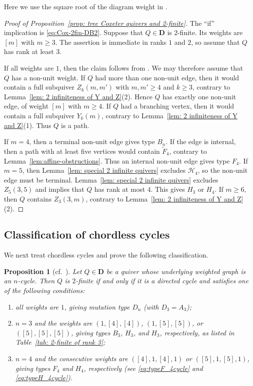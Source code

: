 \documentclass[11pt,reqno]{amsart}
\numberwithin{equation}{section}
\theoremstyle{definition}
\theoremstyle{plain}
\newtheorem{proposition}[example]{Proposition}
\newcommand{\D}{\mathbf{D}}
\newcommand{\bra}[1]{\left[#1\right]}
\begin{document}
	Here we use the square root of the diagram weight in \cite{FZ03a}.
	
	\begin{proof}[Proof of Proposition~\ref{prop: tree Coxeter quivers and 2-finite}]
		The ``if'' implication is \eqref{eq:Cox-2fin-DB2}. Suppose that $Q \in \D$ is $2$-finite. Its weights are $\bra m$ with $m\geq3$. The assertion is immediate in ranks $1$ and $2$, so assume that $Q$ has rank at least $3$.
		
		If all weights are $1$, then the claim follows from \cite[Proposition~9.3]{FZ03a}. We may therefore assume that $Q$ has a non-unit weight. If $Q$ had more than one non-unit edge, then it would contain a full subquiver $Z_k(m,m')$ with $m,m'\geq4$ and $k \geq 3$, contrary to Lemma~\ref{lem: 2 infiniteness of Y and Z}(2). Hence $Q$ has exactly one non-unit edge, of weight $\bra{m}$ with $m\geq4$. If $Q$ had a branching vertex, then it would contain a full subquiver $Y_k(m)$, contrary to Lemma~\ref{lem: 2 infiniteness of Y and Z}(1). Thus $Q$ is a path.
		
		If $m=4$, then a terminal non-unit edge gives type $B_n$. If the edge is internal, then a path with at least five vertices would contain $\widetilde F_4$, contrary to Lemma~\ref{lem:affine-obstructions}. Thus an internal non-unit edge gives type $F_4$. If $m=5$, then Lemma~\ref{lem: special 2 infinite quivers} excludes $\mathcal H_4$, so the non-unit edge must be terminal. Lemma~\ref{lem: special 2 infinite quivers} excludes $Z_5(3,5)$ and implies that $Q$ has rank at most $4$. This gives $H_3$ or $H_4$. If $m\geq6$, then $Q$ contains $Z_3(3,m)$, contrary to Lemma~\ref{lem: 2 infiniteness of Y and Z}(2).
	\end{proof}

\subsection{Classification of chordless cycles}
	We next treat chordless cycles and prove the following classification.
	
	\begin{proposition}[cf.~{\cite[Proposition~9.7]{FZ03a}}]\label{prop: cyclically oriented lemma}
		Let $Q\in\D$ be a quiver whose underlying weighted graph is an $n$-cycle. Then $Q$ is $2$-finite if and only if it is a directed cycle and satisfies one of the following conditions:
    \begin{enumerate}[label=\textup{(\arabic*)}]
      \item all weights are $1$, giving mutation type $D_n$ \textup{(with $D_3=A_3$)};
      \item $n=3$ and the weights are $(1,\bra{4},\bra{4})$, $(1,\bra{5},\bra{5})$, or $(\bra{5},\bra{5},\bra{5})$, giving types $B_3$, $H_3$, and $H_3$, respectively, as listed in Table~\ref{tab: 2-finite of rank 3};
      \item $n=4$ and the consecutive weights are $({\bra{4}},1,{\bra{4}},1)$ or $(\bra{5},1,\bra{5},1)$, giving types $F_4$ and $H_4$, respectively (see \eqref{eq:typeF_4cycle} and \eqref{eq:typeH_4cycle}).
    \end{enumerate}
	\end{proposition}
	
\end{document}
